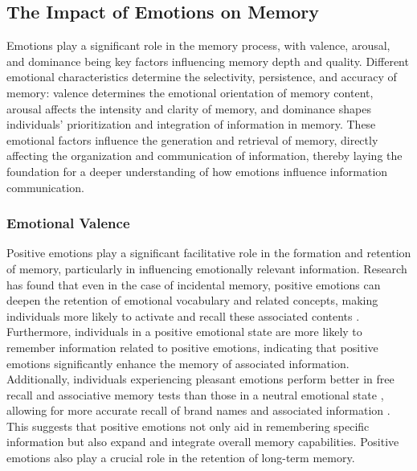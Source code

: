\subsection{The Impact of Emotions on Memory}
Emotions play a significant role in the memory process, with valence, arousal, and dominance being key factors influencing memory depth and quality. Different emotional characteristics determine the selectivity, persistence, and accuracy of memory: valence determines the emotional orientation of memory content, arousal affects the intensity and clarity of memory, and dominance shapes individuals’ prioritization and integration of information in memory. These emotional factors influence the generation and retrieval of memory, directly affecting the organization and communication of information, thereby laying the foundation for a deeper understanding of how emotions influence information communication.

\subsubsection{Emotional Valence}
Positive emotions play a significant facilitative role in the formation and retention of memory, particularly in influencing emotionally relevant information. Research has found that even in the case of incidental memory, positive emotions can deepen the retention of emotional vocabulary and related concepts, making individuals more likely to activate and recall these associated contents \cite{pawlowska2011influence, megalakaki2019effects}. Furthermore, individuals in a positive emotional state are more likely to remember information related to positive emotions, indicating that positive emotions significantly enhance the memory of associated information. Additionally, individuals experiencing pleasant emotions perform better in free recall and associative memory tests than those in a neutral emotional state \cite{lee1999effects, hanson2014happy}, allowing for more accurate recall of brand names and associated information \cite{madan2019positive}. This suggests that positive emotions not only aid in remembering specific information but also expand and integrate overall memory capabilities. Positive emotions also play a crucial role in the retention of long-term memory. 

